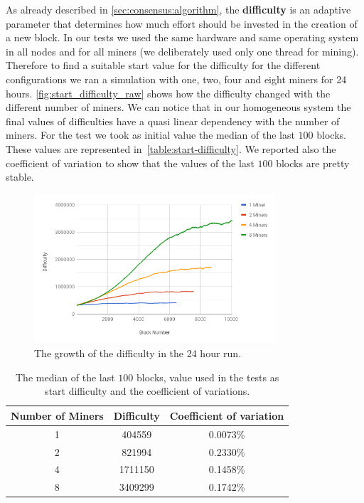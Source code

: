 As already described in \autoref{sec:consensus:algorithm}, the
\textbf{difficulty} is an adaptive parameter that determines how much effort
should be invested in the creation of a new block. In our tests we used the same
hardware and same operating system in all nodes and for all miners (we
deliberately used only one thread for mining). Therefore to find a suitable
start value for the difficulty for the different configurations we ran a
simulation with one, two, four and eight miners for 24 hours.
\autoref{fig:start_difficulty_raw} shows how the difficulty changed with the
different number of miners. We can notice that in our homogeneous system the
final values of difficulties have a quasi linear dependency with the number of
miners. For the test we took as initial value the median of the last $100$
blocks. These values are represented in~\autoref{table:start-difficulty}. We
reported also the coefficient of variation to show that the values of the last
$100$ blocks are pretty stable.
\begin{figure}
  \begin{center}
    \includegraphics[width=0.8\textwidth]{./res/img/start_difficulty_all.png}
    \caption{The growth of the difficulty in the 24 hour run.}
    \label{fig:start_difficulty_raw}
  \end{center}
\end{figure}

\begin{table}
    \begin{center}
        \begin{tabular}{c | c | c}
            Number of Miners & Difficulty & Coefficient of variation \\
            \hline
            1 &  404559 & 0.0073\% \\
            2 &  821994 & 0.2330\%\\
            4 & 1711150 & 0.1458\%\\
            8 & 3409299 & 0.1742\%\\
        \end{tabular}
        \caption{The median of the last $100$ blocks, value used in the tests as
            start difficulty and the coefficient of variations.}
        \label{table:start-difficulty}
    \end{center}
\end{table}


